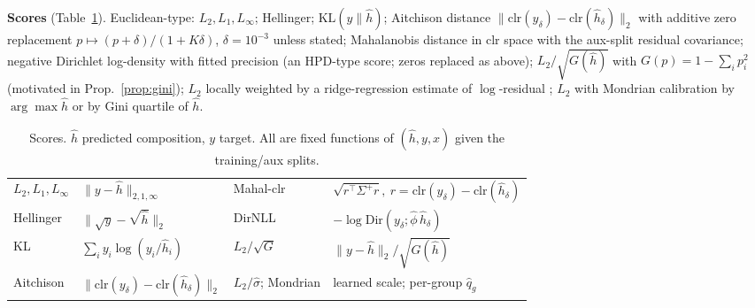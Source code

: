 \documentclass{article}
\newcommand{\hh}{\hat h}
\newcommand{\Gini}{G}
\begin{document}
\textbf{Scores} (Table~\ref{tab:scores}). Euclidean-type: $L_2,L_1,L_\infty$; Hellinger; $\mathrm{KL}(y\|\hh)$; Aitchison distance $\|\mathrm{clr}(y_\delta)-\mathrm{clr}(\hh_\delta)\|_2$ with additive zero replacement $p\mapsto(p+\delta)/(1+K\delta)$, $\delta=10^{-3}$ unless stated; Mahalanobis distance in clr space with the aux-split residual covariance; negative Dirichlet log-density with fitted precision (an HPD-type score; zeros replaced as above); $L_2/\sqrt{\Gini(\hh)}$ with $\Gini(p)=1-\sum_ip_i^2$ (motivated in Prop.~\ref{prop:gini}); $L_2$ locally weighted by a ridge-regression estimate of $\log$-residual \citep{lei2018distribution}; $L_2$ with Mondrian calibration by $\arg\max\hh$ or by Gini quartile of $\hh$.
\begin{table}[t]\centering\small
\caption{Scores. $\hh$ predicted composition, $y$ target. All are fixed functions of $(\hh,y,x)$ given the training/aux splits.}\label{tab:scores}
\begin{tabular}{ll|ll}\toprule
$L_2,L_1,L_\infty$ & $\|y-\hh\|_{2,1,\infty}$ & Mahal-clr & $\sqrt{r^\top\Sigma^+r},\ r=\mathrm{clr}(y_\delta)-\mathrm{clr}(\hh_\delta)$\\
Hellinger & $\|\sqrt y-\sqrt{\hh}\|_2$ & DirNLL & $-\log\mathrm{Dir}(y_\delta;\hat\phi\,\hh_\delta)$\\
KL & $\sum_iy_i\log(y_i/\hh_i)$ & $L_2/\sqrt{\Gini}$ & $\|y-\hh\|_2/\sqrt{\Gini(\hh)}$\\
Aitchison & $\|\mathrm{clr}(y_\delta)-\mathrm{clr}(\hh_\delta)\|_2$ & $L_2/\hat\sigma$; Mondrian & learned scale; per-group $\hat q_g$\\\bottomrule
\end{tabular}\end{table}
\end{document}
